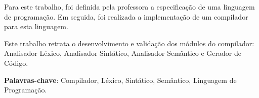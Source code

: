 \setlength{\absparsep}{18pt}
\begin{resumo}
 Para este trabalho, foi definida pela professora a especificação de uma linguagem de programação. Em seguida, foi realizada a implementação de um compilador para esta linguagem.
 
 Este trabalho retrata o desenvolvimento e validação dos módulos do compilador: Analisador Léxico, Analisador Sintático, Analisador Semântico e Gerador de Código.
 
 \textbf{Palavras-chave}: Compilador, Léxico, Sintático, Semântico, Linguagem de Programação.
\end{resumo}